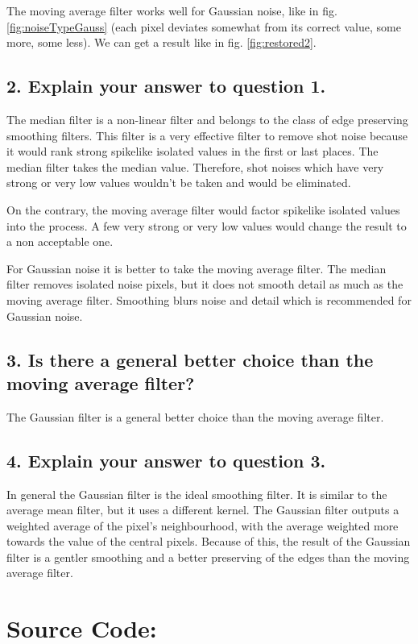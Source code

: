 \documentclass[a4paper,headings=small]{scrartcl}
\numberwithin{equation}{section} %
\numberwithin{figure}{section}   %
\begin{document}
The moving average filter works well for Gaussian noise,
like in fig. \ref{fig:noiseTypeGauss}
(each pixel deviates somewhat from its correct value, some more, some less).
We can get a result like in fig. \ref{fig:restored2}.


\subsection{2. Explain your answer to question 1.}

The median filter is a non-linear filter and belongs to the class of edge preserving smoothing filters. This filter is a very effective filter to remove shot noise because it would rank strong spikelike isolated values in the first or last places. The median filter takes the median value. Therefore, shot noises which have very strong or very low values wouldn't be taken and would be eliminated. 

On the contrary, the moving average filter would factor spikelike isolated values into the process. A few very strong or very low values would change the result to a non acceptable one. 

For Gaussian noise it is better to take the moving average filter. The median filter removes isolated noise pixels, but it does not smooth detail as much as the moving average filter. Smoothing blurs noise and detail which is recommended for Gaussian noise.

\subsection{3. Is there a general better choice than the moving average filter?}

The Gaussian filter is a general better choice than the moving average filter.

\subsection{4. Explain your answer to question 3.}

In general the Gaussian filter is the ideal smoothing filter. It is similar to the average mean filter, but it uses a different kernel. The Gaussian filter outputs a weighted average of the pixel's neighbourhood, with the average weighted more towards the value of the central pixels. Because of this, the result of the Gaussian filter is a gentler smoothing and a better preserving of the edges than the moving average filter.


\newpage
\section{Source Code:}


\end{document}
